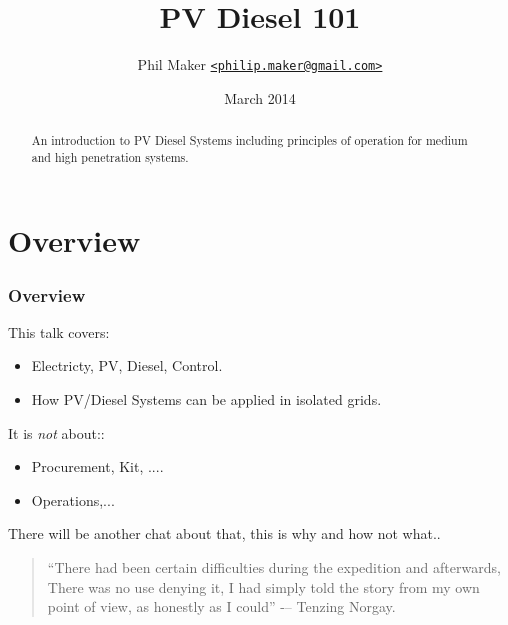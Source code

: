 \documentclass{beamer}
\title{PV Diesel 101}
\author{Phil Maker
  \href{mailto:philip.maker@gmail.com}{\texttt{<philip.maker@gmail.com>}}
}
\institute{Powerwater Remote Operations/ACEP}
\date{March 2014}
\begin{document}
\begin{frame}
  \maketitle
  \vspace{-1.2cm}
  \begin{abstract}
    \small An introduction to PV Diesel Systems including principles
    of operation for medium and high penetration systems.
  \end{abstract}
\end{frame}

\section{Overview}
\begin{frame}\frametitle{Overview}
  This talk covers:
  \begin{itemize}
  \item Electricty, PV, Diesel, Control.
  \item How PV/Diesel Systems can be applied in isolated grids.
  \end{itemize}
  \pause
  It is \emph{not} about::

  \begin{itemize}
  \item Procurement, Kit, ....
  \item Operations,...
  \end{itemize}

  \pause
  There will be another chat about that, this is why and how not what..
  \vfill
  \begin{quote}
    ``There had been certain difficulties during
    the expedition and afterwards, There was
    no use denying it, I had simply told the
    story from my own point of view, as
    honestly as I could'' -– Tenzing Norgay.     
  \end{quote}
\end{frame}
\end{document}
